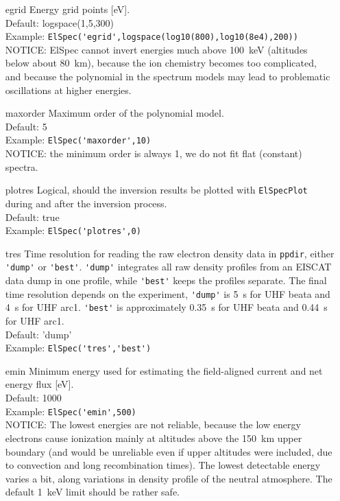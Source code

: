 \documentclass[12pt,a4paper]{report}
\begin{document}
\begin{itemize}
\item[egrid] Energy grid points [eV].\\
Default: logspace(1,5,300)\\
Example: \verb|ElSpec('egrid',logspace(log10(800),log10(8e4),200))|\\
NOTICE: ElSpec cannot invert energies much above 100~keV (altitudes below about 80~km), because the ion chemistry becomes too complicated, and because the polynomial in the spectrum models may lead to problematic oscillations at higher energies. \\

\item[maxorder] Maximum order of the polynomial model.\\
Default: 5\\
Example: \verb|ElSpec('maxorder',10)| \\
NOTICE: the minimum order is always 1, we do not fit flat (constant) spectra.\\

\item[plotres] Logical, should the inversion results be plotted with \verb|ElSpecPlot| during and after the inversion process.\\
Default: true\\
Example: \verb|ElSpec('plotres',0)|\\

\item[tres] Time resolution for reading the raw electron density data in \verb|ppdir|, either \verb|'dump'| or \verb|'best'|.  \verb|'dump'| integrates all raw density profiles from an EISCAT data dump in one profile, while \verb|'best'| keeps the profiles separate. The final time resolution depends on the experiment, \verb|'dump'| is 5~s for UHF beata and 4~s for UHF arc1. \verb|'best'| is approximately 0.35~s for UHF beata and 0.44~s for UHF arc1. \\
Default: 'dump'\\
Example: \verb|ElSpec('tres','best')|\\

\item[emin] Minimum energy used for estimating the field-aligned current and net energy flux [eV].\\
Default: 1000\\
Example: \verb|ElSpec('emin',500)|\\
NOTICE: The lowest energies are not reliable, because the low energy electrons cause ionization mainly at altitudes above the 150~km upper boundary (and would be unreliable even if upper altitudes were included, due to convection and long recombination times). The lowest detectable energy varies a bit, along variations in density profile of the neutral atmosphere. The default 1~keV limit should be rather safe. \\


\end{itemize}
\end{document}
